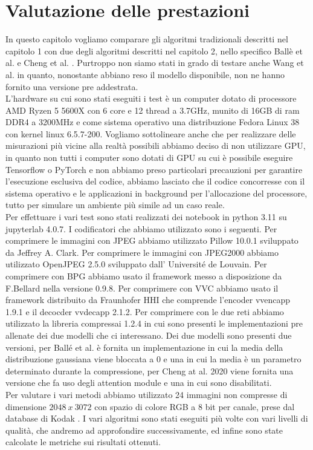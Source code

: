 \chapter{Valutazione delle prestazioni}
In questo capitolo vogliamo comparare gli algoritmi tradizionali descritti nel capitolo 1 con due degli algoritmi descritti nel capitolo 2, nello specifico Ballè et al. \cite{minnen2018joint} e Cheng et al. \cite{cheng2020learned}. Purtroppo non siamo stati in grado di testare anche Wang et al. \cite{wang2022neural} in quanto, nonostante abbiano reso il modello disponibile, non ne hanno fornito una versione pre addestrata.\\
L’hardware su cui sono stati eseguiti i test è un computer dotato di processore AMD Ryzen 5 5600X con 6 core e 12 thread a 3.7GHz, munito di 16GB di ram DDR4 a 3200MHz e come sistema operativo una distribuzione Fedora Linux 38 con kernel linux 6.5.7-200. Vogliamo sottolineare anche che per realizzare delle misurazioni più vicine alla realtà possibili abbiamo deciso di non utilizzare GPU, in quanto non tutti i computer sono dotati di GPU su cui è possibile eseguire Tensorflow o PyTorch e non abbiamo preso particolari precauzioni per garantire l’esecuzione esclusiva del codice, abbiamo lasciato che il codice concorresse con il sistema operativo e le applicazioni in background per l’allocazione del processore, tutto per simulare un ambiente più simile ad un caso reale.\\
Per effettuare i vari test sono stati realizzati dei notebook in python 3.11 su jupyterlab 4.0.7. I codificatori che abbiamo utilizzato sono i seguenti. Per comprimere le immagini con JPEG abbiamo utilizzato Pillow 10.0.1 \cite{PillowLibrary} sviluppato da Jeffrey A. Clark. Per comprimere le immagini con JPEG2000 abbiamo utilizzato OpenJPEG 2.5.0 \cite{OpenJPEGLibrary} sviluppato dall’ Université de Louvain. Per comprimere con BPG abbiamo usato il framework messo a disposizione da F.Bellard \cite{BPGImageformat} nella versione 0.9.8. Per comprimere con VVC abbiamo usato il framework distribuito da Fraunhofer HHI \cite{VVCLibrary} che comprende l’encoder vvencapp 1.9.1 e il decocder vvdecapp 2.1.2. Per comprimere con le due reti abbiamo utilizzato la libreria compressai 1.2.4 \cite{CompressAILibrary} in cui sono presenti le implementazioni pre allenate dei due modelli che ci interessano. Dei due modelli sono presenti due versioni, per Ballé et al. \cite{minnen2018joint} è fornita un implementazione in cui la media della distribuzione gaussiana viene bloccata a 0 e una in cui la media è un parametro determinato durante la compressione, per Cheng at al. 2020 \cite{cheng2020learned} viene fornita una versione che fa uso degli attention module e una in cui sono disabilitati.\\
Per valutare i vari metodi abbiamo utilizzato 24 immagini non compresse di dimensione $2048\:x\:3072$ con spazio di colore RGB a 8 bit per canale, prese dal database di Kodak \cite{KodakDataset}. I vari algoritmi sono stati eseguiti più volte con vari livelli di qualità, che andremo ad approfondire successivamente, ed infine sono state calcolate le metriche sui risultati ottenuti.\\

